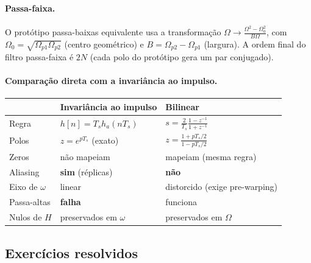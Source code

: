 \paragraph{Passa-faixa.} O protótipo passa-baixas equivalente usa a
transformação $\Omega\to\frac{\Omega^2-\Omega_0^2}{B\Omega}$, com
$\Omega_0=\sqrt{\Omega_{p1}\Omega_{p2}}$ (centro geométrico) e
$B=\Omega_{p2}-\Omega_{p1}$ (largura). A ordem final do filtro passa-faixa é
$2N$ (cada polo do protótipo gera um par conjugado).

\paragraph{Comparação direta com a invariância ao impulso.}
\begin{center}
\begin{tabular}{p{4.1cm}p{4.6cm}p{4.6cm}}
\toprule
 & Invariância ao impulso & Bilinear\\
\midrule
Regra & $h[n]=T_sh_a(nT_s)$ & $s=\frac{2}{T_s}\frac{1-z^{-1}}{1+z^{-1}}$\\
Polos & $z=e^{pT_s}$ (exato) & $z=\frac{1+pT_s/2}{1-pT_s/2}$\\
Zeros & não mapeiam & mapeiam (mesma regra)\\
Aliasing & \textbf{sim} (réplicas) & \textbf{não}\\
Eixo de $\omega$ & linear & distorcido (exige pre-warping)\\
Passa-altas & \textbf{falha} & funciona\\
Nulos de $H$ & preservados em $\omega$ & preservados em $\Omega$\\
\bottomrule
\end{tabular}
\end{center}

\subsection*{Exercícios resolvidos}


